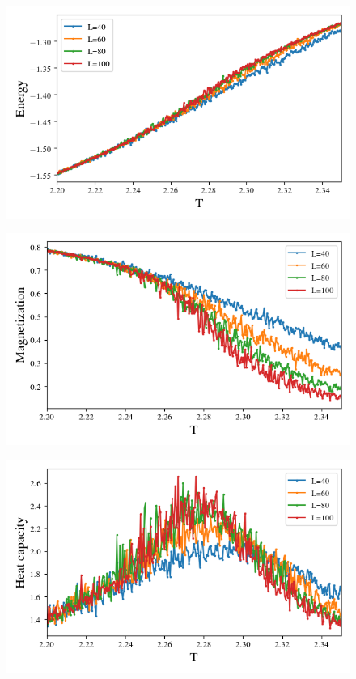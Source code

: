 \begin{figure}[H]
  \centering
  \includegraphics[width=\textwidth]{../figures/phase_E.png}
  \caption{}
  \label{fig:phase_E}
\end{figure}

\begin{figure}[H]
  \centering
  \includegraphics[width=\textwidth]{../figures/phase_Mabs.png}
  \caption{}
  \label{fig:phase_Mabs}
\end{figure}



\begin{figure}[H]
  \centering
  \includegraphics[width=\textwidth]{../figures/phase_cv.png}
  \caption{}
  \label{fig:phase_cv}
\end{figure}


